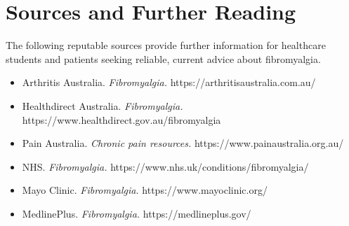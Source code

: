 \section*{Sources and Further Reading}
The following reputable sources provide further information for healthcare students and patients seeking reliable, current advice about fibromyalgia.
\begin{itemize}
    \item Arthritis Australia. \textit{Fibromyalgia.} https://arthritisaustralia.com.au/
    \item Healthdirect Australia. \textit{Fibromyalgia.} https://www.healthdirect.gov.au/fibromyalgia
    \item Pain Australia. \textit{Chronic pain resources.} https://www.painaustralia.org.au/
    \item NHS. \textit{Fibromyalgia.} https://www.nhs.uk/conditions/fibromyalgia/
    \item Mayo Clinic. \textit{Fibromyalgia.} https://www.mayoclinic.org/
    \item MedlinePlus. \textit{Fibromyalgia.} https://medlineplus.gov/
\end{itemize}
